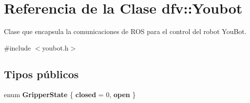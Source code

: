 \hypertarget{classdfv_1_1Youbot}{\section{\-Referencia de la \-Clase dfv\-:\-:\-Youbot}
\label{classdfv_1_1Youbot}
}


\-Clase que encapsula la comunicaciones de \-R\-O\-S para el control del robot \-You\-Bot.  




{\ttfamily \#include $<$youbot.\-h$>$}

\subsection*{\-Tipos públicos}
\begin{DoxyCompactItemize}
\item 
enum {\bfseries \-Gripper\-State} \{ {\bfseries closed} =  0, 
{\bfseries open}
 \}
\end{DoxyCompactItemize}
